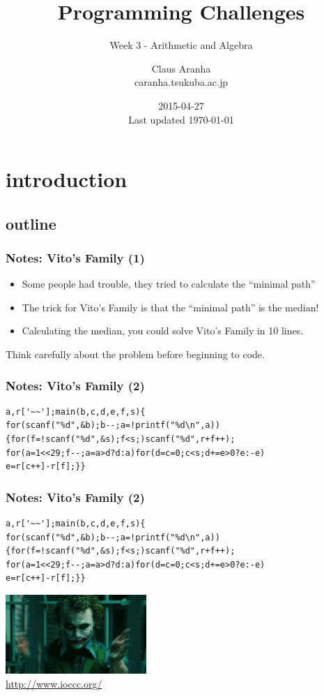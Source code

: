 \documentclass{beamer}
\title[]{Programming Challenges}
\subtitle[]{Week 3 - Arithmetic and Algebra}
\author[Claus Aranha]{Claus Aranha\\{\footnotesize caranha\@@cs.tsukuba.ac.jp}}
\institute{College of Information Sciences}
\date{2015-04-27\\{\tiny Last updated \today}}
\begin{document}
\section{introduction}
\subsection{outline}

\begin{frame}
\maketitle
\end{frame}

\begin{frame}
  \frametitle{Notes: Vito's Family (1)}
  \begin{itemize}
  \item Some people had trouble, they tried to calculate the ``minimal path''
  \item The trick for Vito's Family is that the ``minimal path'' is the median!
  \item Calculating the median, you could solve Vito's Family in 10 lines.
  \end{itemize}
  \begin{block}{}
    Think carefully about the problem before beginning to code.
  \end{block}
\end{frame}

\begin{frame}
  \frametitle{Notes: Vito's Family (2)}
\begin{verbatim}
a,r['~~'];main(b,c,d,e,f,s){
for(scanf("%d",&b);b--;a=!printf("%d\n",a))
{for(f=!scanf("%d",&s);f<s;)scanf("%d",r+f++);
for(a=1<<29;f--;a=a>d?d:a)for(d=c=0;c<s;d+=e>0?e:-e)
e=r[c++]-r[f];}}
\end{verbatim}
\end{frame}

\begin{frame}
  \frametitle{Notes: Vito's Family (2)}
\begin{verbatim}
a,r['~~'];main(b,c,d,e,f,s){
for(scanf("%d",&b);b--;a=!printf("%d\n",a))
{for(f=!scanf("%d",&s);f<s;)scanf("%d",r+f++);
for(a=1<<29;f--;a=a>d?d:a)for(d=c=0;c<s;d+=e>0?e:-e)
e=r[c++]-r[f];}}
\end{verbatim}
\includegraphics[width=0.4\textwidth]{img/joker}\\
\url{http://www.ioccc.org/}
\end{frame}
\end{document}
